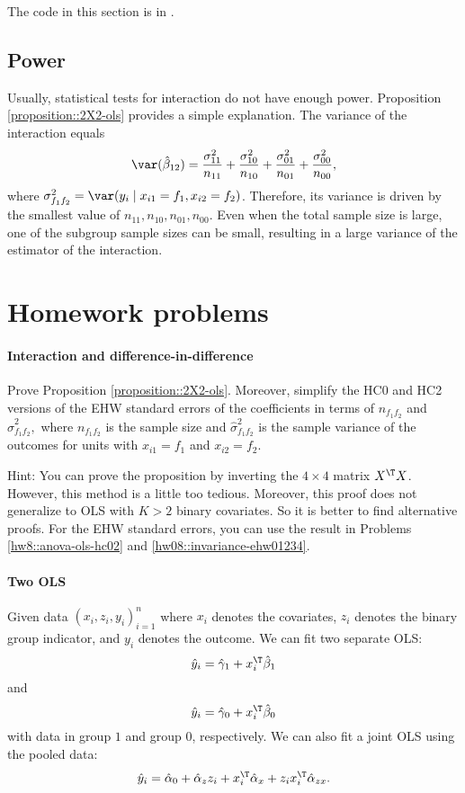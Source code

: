 The  code in this section is in . 


\subsection{Power}

Usually, statistical tests for interaction do not have enough power. Proposition \ref{proposition::2X2-ols} provides a simple explanation. The variance of the interaction equals
$$
\var(\hat{\beta}_{12}) = \frac{\sigma_{11}^2}{n_{11}} + \frac{\sigma_{10}^2}{n_{10}}  +\frac{\sigma_{01}^2}{n_{01}}  +\frac{\sigma_{00}^2}{n_{00}} ,
$$
where $\sigma^2_{f_1f_2} = \var(y_i \mid x_{i1}   = f_1, x_{i2} = f_2)$. 
Therefore, its variance is driven by the smallest value of $n_{11}, n_{10}, n_{01}, n_{00}$. Even when the total sample size is large, one of the subgroup sample sizes can be small, resulting in a large variance of the estimator of the interaction. 



\section{Homework problems}

\paragraph{Interaction and difference-in-difference}\label{hw15interaction::2X2ols}

Prove Proposition \ref{proposition::2X2-ols}. Moreover, simplify the HC0 and HC2 versions of the EHW standard errors of the coefficients in terms of $n_{f_1 f_2}$ and $\hat \sigma^2_{f_1f_2} ,$ where $n_{f_1 f_2}$ is the sample size and $\hat \sigma^2_{f_1f_2}$ is the sample variance of the outcomes for units with $x_{i1} = f_1$ and $x_{i2} = f_2$. 


Hint: You can prove the proposition by inverting the $4\times 4$ matrix $X^{\T} X$. However, this method is a little too tedious. Moreover, this proof does not generalize to OLS with $K > 2$ binary covariates. So it is better to find alternative proofs.
For the EHW standard errors, you can use the result in Problems \ref{hw8::anova-ols-hc02} and \ref{hw08::invariance-ehw01234}. 



\paragraph{Two OLS}\label{hw15interaction::2ols}
Given data $(x_i, z_i, y_i)_{i=1}^n$ where $x_i$ denotes the covariates, $z_i$ denotes the binary group indicator, and $y_i$ denotes the outcome. We can fit two separate OLS:
$$
\hat{y}_i =  \hat\gamma_1 + x_i^{\T} \hat \beta_1
$$
and
$$
\hat{y}_i =   \hat   \gamma_0 + x_i^{\T} \hat \beta_0
$$
with  data in group $1$ and group $0$, respectively. We can also fit a joint OLS using the pooled data:
$$
\hat{y}_i =   \hat \alpha_0 + \hat\alpha_z z_i + x_i^{\T} \hat\alpha_x  +  z_i x_i^{\T} \hat\alpha_{zx}.
$$

